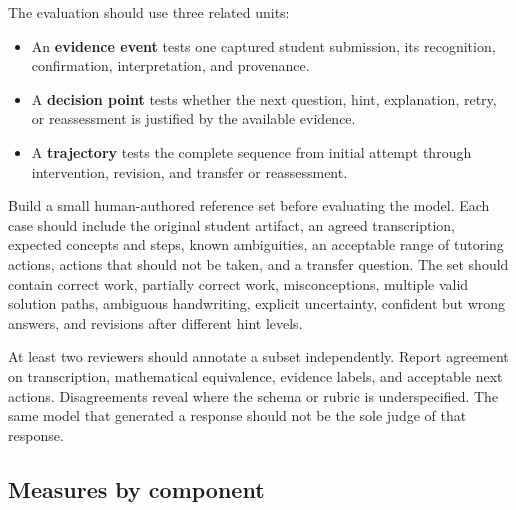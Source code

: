 \documentclass[11pt]{article}
\begin{document}
The evaluation should use three related units:

\begin{itemize}
    \item An \textbf{evidence event} tests one captured student submission, its recognition, confirmation, interpretation, and provenance.
    \item A \textbf{decision point} tests whether the next question, hint, explanation, retry, or reassessment is justified by the available evidence.
    \item A \textbf{trajectory} tests the complete sequence from initial attempt through intervention, revision, and transfer or reassessment.
\end{itemize}

Build a small human-authored reference set before evaluating the model. Each case should include the original student artifact, an agreed transcription, expected concepts and steps, known ambiguities, an acceptable range of tutoring actions, actions that should not be taken, and a transfer question. The set should contain correct work, partially correct work, misconceptions, multiple valid solution paths, ambiguous handwriting, explicit uncertainty, confident but wrong answers, and revisions after different hint levels.

At least two reviewers should annotate a subset independently. Report agreement on transcription, mathematical equivalence, evidence labels, and acceptable next actions. Disagreements reveal where the schema or rubric is underspecified. The same model that generated a response should not be the sole judge of that response.

\subsection{Measures by component}
\end{document}

